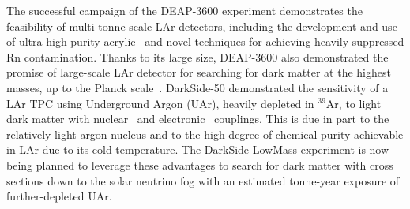 The successful campaign of the DEAP-3600 experiment demonstrates the feasibility of multi-tonne-scale LAr detectors, including the development and use of ultra-high purity acrylic~\cite{amaudruzDesignConstructionDEAP36002019a} and novel techniques for achieving heavily suppressed Rn contamination. Thanks to its large size, DEAP-3600 also demonstrated the promise of large-scale LAr detector for searching for dark matter at the highest masses, up to the Planck scale~\cite{deapcollaborationFirstDirectDetection2022}.  DarkSide-50 demonstrated the sensitivity of a LAr TPC using Underground Argon (UAr), heavily depleted in $^{39}$Ar, to light dark matter with nuclear~\cite{darksidecollaborationLowMassDarkMatter2018} and electronic~\cite{thedarksidecollaborationConstraintsSubGeVDarkMatter2018} couplings. This is due in part to the relatively light argon nucleus and to the high degree of chemical purity achievable in LAr due to its cold temperature.  The DarkSide-LowMass experiment is now being planned to leverage these advantages to search for dark matter with cross sections down to the solar neutrino fog with an estimated tonne-year exposure of further-depleted UAr.

